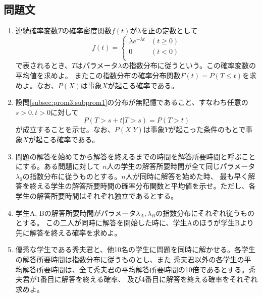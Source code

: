 \documentclass[dvipdfmx,titlepage, 11pt, a4paper]{jsarticle}%
\begin{document}
\subsection{問題文}
\begin{enumerate}[(1)]
    \item 連続確率変数$T$の確率密度関数$f(t)$が$\lambda$を正の定数として
        \begin{equation*}
            f(t) = 
            \begin{cases}
                \lambda e^{-\lambda t} & (t\geq 0)\\    
                0 & (t < 0)\\    
            \end{cases}
        \end{equation*}
        で表されるとき、$T$はパラメータ$\lambda$の指数分布に従うという。この確率変数の平均値を求めよ。
        またこの指数分布の確率分布関数$F(t) = P (T\leq t)$を求めよ。なお、$P(X)$は事象$X$が起こる確率である。\label{subsec:prom3:subprom1}
    \item 設問\eqref{subsec:prom3:subprom1}の分布が無記憶であること、すなわち任意の$s > 0, t > 0$に対して
        \begin{equation*}
            P(T > s + t | T > s) = P(T > t)
        \end{equation*}
        が成立することを示せ。なお、$P(X|Y)$は事象$Y$が起こった条件のもとで事象$X$が起こる確率である。\label{subsec:prom3:subprom2}
    \item 問題の解答を始めてから解答を終えるまでの時間を解答所要時間と呼ぶことにする。ある問題に対して
        $n$人の学生の解答所要時間が全て同じパラメータ$\lambda_0$の指数分布に従うものとする。$n$人が同時に解答を始めた時、
        最も早く解答を終える学生の解答所要時間の確率分布関数と平均値を示せ。ただし、各学生の解答所要時間はそれぞれ独立であるとする。\label{subsec:prom3:subprom3}
    \item 学生A, Bの解答所要時間がパラメータ$\lambda_A, \lambda_B$の指数分布にそれぞれ従うものとする。
        この二人が同時に解答を開始した時に、学生Aのほうが学生Bより先に解答を終える確率を求めよ。\label{subsec:prom3:subprom4}
    \item 優秀な学生である秀夫君と、他10名の学生に問題を同時に解かせる。各学生の解答所要時間は指数分布に従うものとし、また
    秀夫君以外の各学生の平均解答所要時間は、全て秀夫君の平均解答所要時間の10倍であるとする。秀夫君が1番目に解答を終える確率、
    及び4番目に解答を終える確率をそれぞれ求めよ。\label{subsec:prom3:subprom5}
\end{enumerate}
\newpage
\end{document}
